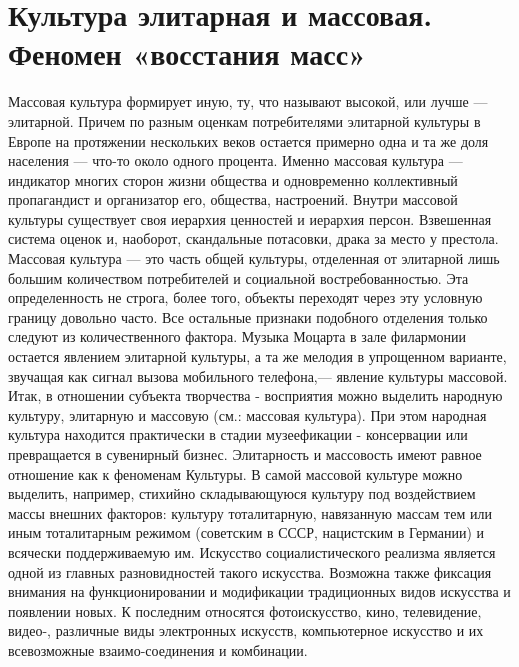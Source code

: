 \documentclass[12pt]{article}
\begin{document}
\newpage
\section{Культура элитарная и массовая. Феномен «восстания масс»}
Массовая культура формирует иную, ту, что называют высокой, или лучше — элитарной. Причем по разным
оценкам потребителями элитарной культуры в Европе на протяжении нескольких веков остается примерно одна
и та же доля населения — что-то около одного процента. Именно массовая культура — индикатор многих
сторон жизни общества и одновременно коллективный пропагандист и организатор его, общества, настроений.
Внутри  массовой  культуры  существует  своя  иерархия  ценностей  и  иерархия  персон.  Взвешенная  система
оценок и, наоборот, скандальные потасовки, драка за место у престола.
Массовая  культура  —  это  часть  общей  культуры,  отделенная  от  элитарной  лишь  большим  количеством
потребителей и социальной востребованностью. Эта определенность не строга, более того, объекты переходят
через эту условную границу довольно часто. Все остальные признаки подобного отделения только следуют из
количественного фактора.
Музыка Моцарта в зале филармонии остается явлением элитарной культуры, а та же мелодия в упрощенном
варианте, звучащая как сигнал вызова мобильного телефона,— явление культуры массовой.
Итак,  в  отношении  субъекта  творчества  -  восприятия  можно  выделить  народную  культуру,  элитарную  и
массовую (см.: массовая культура). При этом народная культура находится практически в стадии музеефикации
- консервации или превращается в сувенирный бизнес.
Элитарность и массовость имеют равное отношение как к феноменам Культуры. В самой массовой культуре
можно выделить, например, стихийно складывающуюся культуру под воздействием массы внешних факторов:
культуру  тоталитарную,  навязанную  массам  тем  или  иным  тоталитарным  режимом  (советским  в  СССР,
нацистским в Германии) и всячески поддерживаемую им. Искусство социалистического реализма является
одной из главных разновидностей такого искусства.
Возможна также фиксация внимания на функционировании и модификации традиционных видов искусства и
появлении  новых.  К  последним  относятся  фотоискусство,  кино,  телевидение,  видео-,  различные  виды
электронных искусств, компьютерное искусство и их всевозможные взаимо-соединения и комбинации. 
\end{document}
